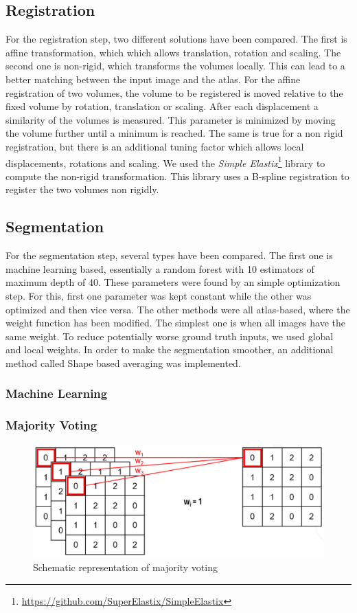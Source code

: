 \subsection*{Registration}
For the registration step, two different solutions have been compared. The first is affine transformation, which which allows translation, rotation and scaling. The second one is non-rigid, which transforms the volumes locally. This can lead to a better matching between the input image and the atlas. For the affine registration of two volumes, the volume to be registered is moved relative to the fixed volume by rotation, translation or scaling. After each displacement a similarity of the volumes is measured. This parameter is minimized by moving the volume further until a minimum is reached. The same is true for a non rigid registration, but there is an additional tuning factor which allows local displacements, rotations and scaling. We used the \textit{Simple Elastix}\footnote{\url{https://github.com/SuperElastix/SimpleElastix}} library to compute the non-rigid transformation. This library uses a B-spline registration to register the two volumes non rigidly.

\subsection*{Segmentation}
For the segmentation step, several types have been compared. The first one is machine learning based, essentially a random forest with 10 estimators of maximum depth of 40. These parameters were found by an simple optimization step. For this, first one parameter was kept constant while the other was optimized and then vice versa. The other methods were all atlas-based, where the weight function has been modified. The simplest one is when all images have the same weight. To reduce potentially worse ground truth inputs, we used global and local weights. In order to make the segmentation smoother, an additional method called Shape based averaging was implemented.

\subsubsection*{Machine Learning}
\subsubsection*{Majority Voting}

\begin{figure}[h!]
	\centering
	\includegraphics[width=0.8\linewidth]{img/majorityVoting}
	\caption{Schematic representation of majority voting}
	\label{fig:majorityVoting}
\end{figure}

